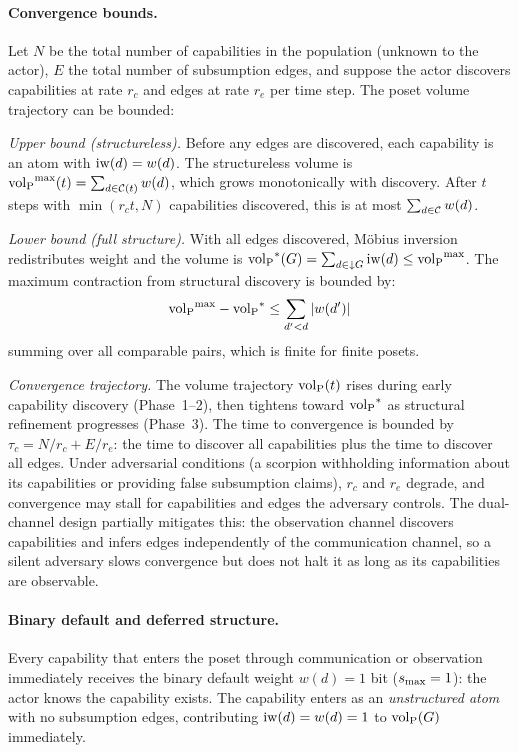 \paragraph{Convergence bounds.} Let $N$ be the total number of capabilities in
the population (unknown to the actor), $E$ the total number of subsumption
edges, and suppose the actor discovers capabilities at rate $r_c$ and edges at
rate $r_e$ per time step. The poset volume trajectory can be bounded:

\emph{Upper bound (structureless).} Before any edges are discovered, each
capability is an atom with $\operatorname{iw}(d) = w(d)$. The structureless volume is
${\operatorname{vol}_{\mathrm{P}}}^{\max}(t) = \sum_{d \in \mathcal{C}(t)} w(d)$, which grows monotonically with
discovery. After $t$ steps with $\min(r_c t, N)$ capabilities discovered, this
is at most $\sum_{d \in \mathcal{C}} w(d)$.

\emph{Lower bound (full structure).} With all edges discovered, M\"{o}bius
inversion redistributes weight and the volume is
${\operatorname{vol}_{\mathrm{P}}}^*(G) = \sum_{d \in \downarrow G} \operatorname{iw}(d) \leq {\operatorname{vol}_{\mathrm{P}}}^{\max}$. The maximum
contraction from structural discovery is bounded by:
\begin{equation}
\label{eq:max_contraction}
{\operatorname{vol}_{\mathrm{P}}}^{\max} - {\operatorname{vol}_{\mathrm{P}}}^* \leq \sum_{d' < d} |w(d')|
\end{equation}
summing over all comparable pairs, which is finite for finite posets.

\emph{Convergence trajectory.} The volume trajectory ${\operatorname{vol}_{\mathrm{P}}}(t)$ rises during
early capability discovery (Phase~1--2), then tightens toward ${\operatorname{vol}_{\mathrm{P}}}^*$ as
structural refinement progresses (Phase~3). The time to convergence is bounded
by $\tau_c = N/r_c + E/r_e$: the time to discover all capabilities plus the
time to discover all edges. Under adversarial conditions (a scorpion
withholding information about its capabilities or providing false subsumption
claims), $r_c$ and $r_e$ degrade, and convergence may stall for capabilities
and edges the adversary controls. The dual-channel design partially mitigates
this: the observation channel discovers capabilities and infers edges
independently of the communication channel, so a silent adversary slows
convergence but does not halt it as long as its capabilities are observable.

\paragraph{Binary default and deferred structure.} Every capability that
enters the poset through communication or observation immediately receives
the binary default weight $w(d) = 1$ bit ($s_{\mathrm{max}} = 1$): the actor knows the
capability exists. The capability enters as an \emph{unstructured atom} with no
subsumption edges, contributing $\operatorname{iw}(d) = w(d) = 1$ to ${\operatorname{vol}_{\mathrm{P}}}(G)$ immediately.

